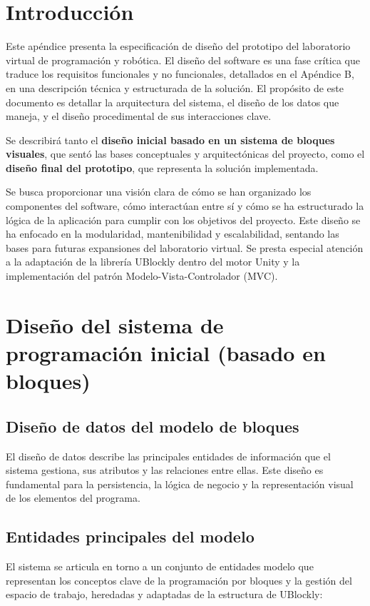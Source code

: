 
\section{Introducción}
Este apéndice presenta la especificación de diseño del prototipo del laboratorio virtual de programación y robótica. El diseño del software es una fase crítica que traduce los requisitos funcionales y no funcionales, detallados en el Apéndice B, en una descripción técnica y estructurada de la solución. El propósito de este documento es detallar la arquitectura del sistema, el diseño de los datos que maneja, y el diseño procedimental de sus interacciones clave.

Se describirá tanto el \textbf{diseño inicial basado en un sistema de bloques visuales}, que sentó las bases conceptuales y arquitectónicas del proyecto, como el \textbf{diseño final del prototipo}, que representa la solución implementada.

Se busca proporcionar una visión clara de cómo se han organizado los componentes del software, cómo interactúan entre sí y cómo se ha estructurado la lógica de la aplicación para cumplir con los objetivos del proyecto. Este diseño se ha enfocado en la modularidad, mantenibilidad y escalabilidad, sentando las bases para futuras expansiones del laboratorio virtual. Se presta especial atención a la adaptación de la librería UBlockly dentro del motor Unity y la implementación del patrón Modelo-Vista-Controlador (MVC).

\section{Diseño del sistema de programación inicial (basado en bloques)}
\subsection{Diseño de datos del modelo de bloques}
El diseño de datos describe las principales entidades de información que el sistema gestiona, sus atributos y las relaciones entre ellas. Este diseño es fundamental para la persistencia, la lógica de negocio y la representación visual de los elementos del programa.

\subsection{Entidades principales del modelo}
El sistema se articula en torno a un conjunto de entidades modelo que representan los conceptos clave de la programación por bloques y la gestión del espacio de trabajo, heredadas y adaptadas de la estructura de UBlockly:

